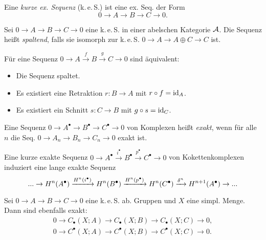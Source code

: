\documentclass{cheat-sheet}
\newcommand{\CC}[1]{{#1}_{\bullet}} %
\newcommand{\CCC}[1]{{#1}^{\bullet}} %
\newcommand{\keS}{k.\,e.\,S.} %
\begin{document}
\begin{defn}
  Eine \emph{kurze ex. Sequenz} (\keS{}) ist eine ex. Seq. der Form
  \[ 0 \to A \to B \to C \to 0. \]
\end{defn}

\begin{defn}
  Sei $0 \to A \to B \to C \to 0$ eine \keS{} in einer abelschen Kategorie $\mathcal{A}$. Die Sequenz heißt \emph{spaltend}, falls sie isomorph zur \keS{} $0 \to A \to A \oplus C \to C$ ist.
\end{defn}

\begin{prop}
  Für eine Sequenz $0 \to A \xrightarrow{f} B \xrightarrow{g} C \to 0$ sind äquivalent:
  \begin{itemize}
    \item Die Sequenz spaltet.
    \item Es existiert eine Retraktion $r : B \to A$ mit $r \circ f = \operatorname{id}_A$.
    \item Es existiert ein Schnitt $s : C \to B$ mit $g \circ s = \operatorname{id}_C$.
  \end{itemize}
\end{prop}

\begin{defn}
  Eine Sequenz $0 \to \CCC{A} \to \CCC{B} \to \CCC{C} \to 0$ von Komplexen heißt \emph{exakt}, wenn für alle $n$ die Seq. $0 \to A_n \to B_n \to C_n \to 0$ exakt ist.
\end{defn}


\begin{prop}
  Eine kurze exakte Sequenz
  $0 \to \CCC{A} \xrightarrow{i^\bullet} \CCC{B} \xrightarrow{p^\bullet} \CCC{C} \to 0$
  von Kokettenkomplexen induziert eine lange exakte Sequenz
  \[ \nldots \to H^n(\CCC{A}) \xrightarrow{H^n(i^\bullet)} H^n(\CCC{B}) \xrightarrow{H^n(p^\bullet)} H^n(\CCC{C}) \xrightarrow{\delta^n} H^{n+1}(\CCC{A}) \to \nldots \]
\end{prop}

\begin{lem}
  Sei $0 \to A \to B \to C \to 0$ eine \keS{} ab. Gruppen und $X$ eine simpl. Menge.
  Dann sind ebenfalls exakt:
  \begin{align*}
    0 \to \CC{C}(X; A) \to \CC{C}(X; B) \to \CC{C}(X; C) \to 0, \\
    0 \to \CCC{C}(X; A) \to \CCC{C}(X; B) \to \CCC{C}(X; C) \to 0.
  \end{align*}
\end{lem}
\end{document}
